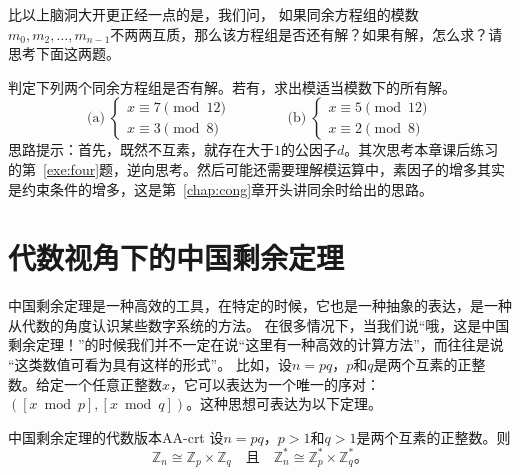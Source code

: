 比以上脑洞大开更正经一点的是，我们问，
如果同余方程组的模数$m_0, m_2, \ldots, m_{n-1}$不两两互质，那么该方程组是否还有解？如果有解，怎么求？请思考下面这两题。
\begin{thinking}
		判定下列两个同余方程组是否有解。若有，求出模适当模数下的所有解。
		\[
		\text{(a)}\;
		\begin{cases}
			x \equiv 7 \pmod{12} \\
			x \equiv 3 \pmod{8}
		\end{cases}
		\qquad\qquad
		\text{(b)}\;
		\begin{cases}
			x \equiv 5 \pmod{12} \\
			x \equiv 2 \pmod{8}
		\end{cases}
		\]
	思路提示：首先，既然不互素，就存在大于$1$的公因子$d$。其次思考本章课后练习的第~\ref{exe:four}题，逆向思考。然后可能还需要理解模运算中，素因子的增多其实是约束条件的增多，这是第~\ref{chap:cong}章开头讲同余时给出的思路。
\end{thinking}


\section{代数视角下的中国剩余定理} 
\label{sec:AA-crt}
中国剩余定理是一种高效的工具，在特定的时候，它也是一种抽象的表达，是一种从代数的角度认识某些数字系统的方法。
在很多情况下，当我们说“哦，这是中国剩余定理！”的时候我们并不一定在说“这里有一种高效的计算方法”，而往往是说
“这类数值可看为具有这样的形式”。
比如，设$n = pq$，$p$和$q$是两个互素的正整数。给定一个任意正整数$x$，它可以表达为一个唯一的序对：
$( [x \bmod p], [x \bmod q ])$。这种思想可表达为以下定理。

\begin{theorem}{中国剩余定理的代数版本}{AA-crt}
设$n = pq$，$p>1$和$q>1$是两个互素的正整数。则
	\[\mathbb{Z}_n \cong \mathbb{Z}_p \times \mathbb{Z}_q \quad \text{且} \quad \mathbb{Z}_n^* \cong \mathbb{Z}_p^* \times \mathbb{Z}_q^* \text{。}\]
\end{theorem}

